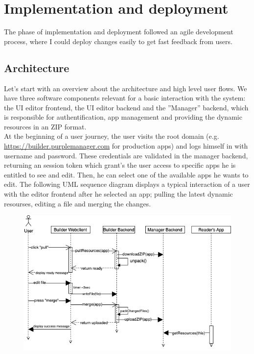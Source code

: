 
%
\chapter{Implementation and deployment}
\label{chap:impl} 

The phase of implementation and deployment followed an agile development process, where I could deploy changes easily to get fast feedback from users.


\section{Architecture}

Let's start with an overview about the architecture and high level user flows.
We have three software components relevant for a basic interaction with the system: the UI editor frontend, the UI editor backend and the ''Manager'' backend, which is responsible for
authentification, app management and providing the dynamic resources in an ZIP format.
\\
At the beginning of a user journey, the user visits the root domain (e.g. \url{https://builder.purplemanager.com} for production apps) and logs himself in with username and password.
These credentials are validated in the manager backend, returning an session token which grant's the user access to specific apps he is entitled to see and edit.
Then, he can select one of the available apps he wants to edit.
The following UML sequence diagram displays a typical interaction of a user with the editor frontend after he selected an app; pulling the latest dynamic resourses, editing a file and merging the changes.
\begin{figure}[h]
  \includegraphics[width=\textwidth]{pics/user-flow.uml.drawio.png}
\end{figure}

